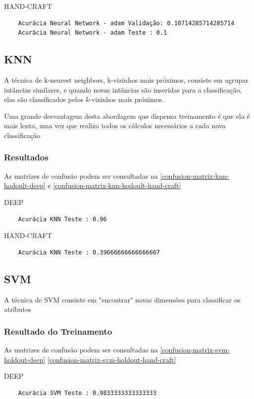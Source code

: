 \documentclass[
article,			%
11pt,				%
oneside,			%
a4paper,			%
english,			%
brazil,				%
sumario=tradicional,
]{abntex2}
\begin{document}
	HAND-CRAFT
	\begin{verbatim}
	Acurácia Neural Network - adam Validação: 0.10714285714285714
	Acurácia Neural Network - adam Teste : 0.1
	\end{verbatim}
	
	\subsection{KNN}
	
	A técnica de k-nearest neighbors, k-vizinhos mais próximos, consiste em agrupar intâncias similares, e quando novas intâncias são inseridas para a classificação, elas são classificados pelos \(k\)-vizinhos mais próximos.
	
	Uma grande desvantagem desta abordagem que dispensa treinamento é que ela é mais lenta, uma vez que realiza todos os cálculos necessários a cada nova classificação
	
	\subsubsection{Resultados}
	
	As matrizes de confusão podem ser consultadas na \autoref{confusion-matrix-knn-hodoult-deep} e \autoref{confusion-matrix-knn-hodoult-hand-craft}
	
	DEEP	
	\begin{verbatim}
	Acurácia KNN Teste : 0.96
	\end{verbatim}
	
	HAND-CRAFT
	\begin{verbatim}
	Acurácia KNN Teste : 0.39666666666666667
	\end{verbatim}
	
	
	\subsection{SVM}
	A técnica de SVM consiste em "encontrar" novas dimensões para classificar os atríbutos
	\subsubsection{Resultado do Treinamento}
		
	As matrizes de confusão podem ser consultadas na \autoref{confusion-matrix-svm-holdout-deep} \autoref{confusion-matrix-svm-holdout-hand-craft}
		
	DEEP	
	\begin{verbatim}
	Acurácia SVM Teste : 0.9833333333333333
	\end{verbatim}
	
\end{document}
